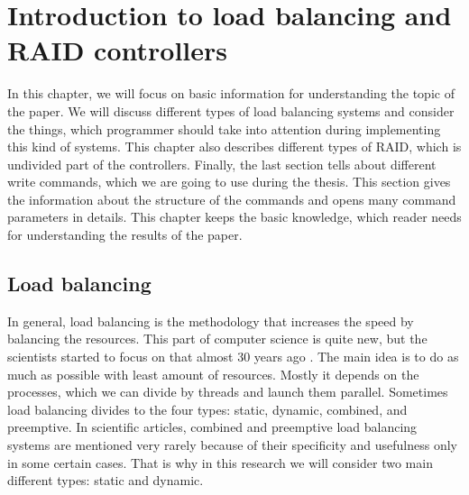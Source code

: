 \chapter{Introduction to load balancing and RAID controllers}
\label{chap2:title}

In this chapter, we will focus on basic information for understanding the topic of the paper. We will discuss different types of load balancing systems and consider the things, which programmer should take into attention during implementing this kind of systems. This chapter also describes different types of RAID, which is undivided part of the controllers. Finally, the last section tells about different write commands, which we are going to use during the thesis. This section gives the information about the structure of the commands and opens many command parameters in details. This chapter keeps the basic knowledge, which reader needs for understanding the results of the paper.

\newpage
\section{Load balancing}
In general, load balancing is the methodology that increases the speed by balancing the resources. This part of computer science is quite new, but the scientists started to focus on that almost 30 years ago \cite{stat_load_bal_1985}. The main idea is to do as much as possible with least amount of resources. Mostly it depends on the processes, which we can divide by threads and launch them parallel. Sometimes load balancing divides to the four types: static, dynamic, combined, and preemptive. In scientific articles, combined and preemptive load balancing systems are mentioned very rarely because of their specificity and usefulness only in some certain cases. That is why in this research we will consider two main different types: static and dynamic.

